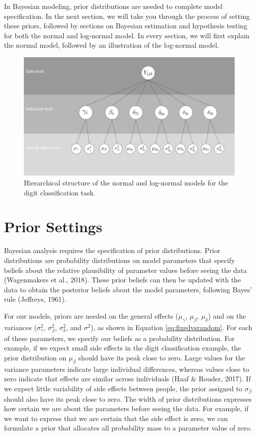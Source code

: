 \documentclass[
  english,
  doc,floatsintext]{apa6}
\begin{document}
In Bayesian modeling, prior distributions are needed to complete model specification. In the next section, we will take you through the process of setting these priors, followed by sections on Bayesian estimation and hypothesis testing for both the normal and log-normal model. In every section, we will first explain the normal model, followed by an illustration of the log-normal model.

\begin{figure}[H]

\includegraphics[width=0.7\linewidth]{Images/Fig2_Hierarchical structure} \hfill{}

\caption{Hierarchical structure of the normal and log-normal models for the digit classification task.}\label{fig:hierarchyplot}
\end{figure}

\hypertarget{prior-settings}{%
\section{Prior Settings}\label{prior-settings}}

Bayesian analysis requires the specification of prior distributions. Prior distributions are probability distributions on model parameters that specify beliefs about the relative plausibility of parameter values before seeing the data (Wagenmakers et al., 2018). These prior beliefs can then be updated with the data to obtain the posterior beliefs about the model parameters, following Bayes' rule (Jeffreys, 1961).

For our models, priors are needed on the general effects (\(\mu_{\gamma}\), \(\mu_{\beta}\), \(\mu_{\delta}\)) and on the variances (\(\sigma_{\gamma}^2\), \(\sigma_{\beta}^2\), \(\sigma_{\delta}^2\), and \(\sigma^2\)), as shown in Equation \eqref{eq:fixedvsrandom}. For each of these parameters, we specify our beliefs as a probability distribution. For example, if we expect small side effects in the digit classification example, the prior distribution on \(\mu_{\beta}\) should have its peak close to zero. Large values for the variance parameters indicate large individual differences, whereas values close to zero indicate that effects are similar across individuals (Haaf \& Rouder, 2017). If we expect little variability of side effects between people, the prior assigned to \(\sigma_{\beta}\) should also have its peak close to zero. The width of prior distributions expresses how certain we are about the parameters before seeing the data. For example, if we want to express that we are certain that the side effect is zero, we can formulate a prior that allocates all probability mass to a parameter value of zero.
\end{document}
